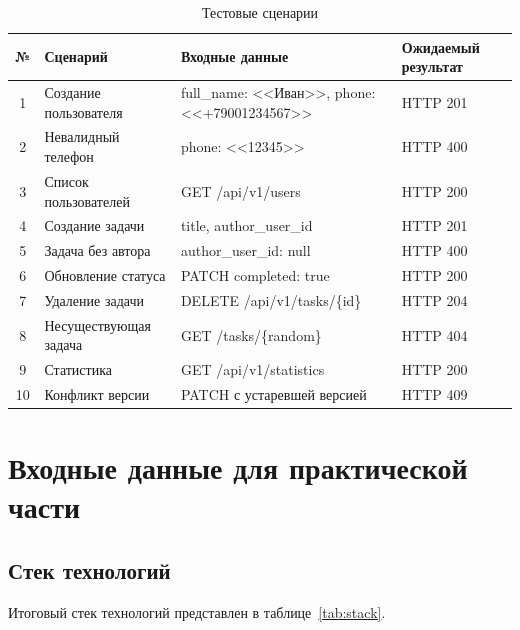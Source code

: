 \documentclass[a4paper,14pt]{extarticle}
\begin{document}
\begin{table}[H]
\caption{Тестовые сценарии}\label{tab:tests}
\centering
\small
\begin{tabularx}{\textwidth}{|c|X|X|X|}
\hline
\textbf{№} & \textbf{Сценарий} & \textbf{Входные данные} & \textbf{Ожидаемый результат} \\
\hline
1 & Создание пользователя & full\_name: <<Иван>>, phone: <<+79001234567>> & HTTP 201 \\
\hline
2 & Невалидный телефон & phone: <<12345>> & HTTP 400 \\
\hline
3 & Список пользователей & GET /api/v1/users & HTTP 200 \\
\hline
4 & Создание задачи & title, author\_user\_id & HTTP 201 \\
\hline
5 & Задача без автора & author\_user\_id: null & HTTP 400 \\
\hline
6 & Обновление статуса & PATCH completed: true & HTTP 200 \\
\hline
7 & Удаление задачи & DELETE /api/v1/tasks/\{id\} & HTTP 204 \\
\hline
8 & Несуществующая задача & GET /tasks/\{random\} & HTTP 404 \\
\hline
9 & Статистика & GET /api/v1/statistics & HTTP 200 \\
\hline
10 & Конфликт версии & PATCH с устаревшей версией & HTTP 409 \\
\hline
\end{tabularx}
\end{table}

\section{Входные данные для практической части}

\subsection{Стек технологий}

Итоговый стек технологий представлен в таблице~\ref{tab:stack}.
\end{document}
